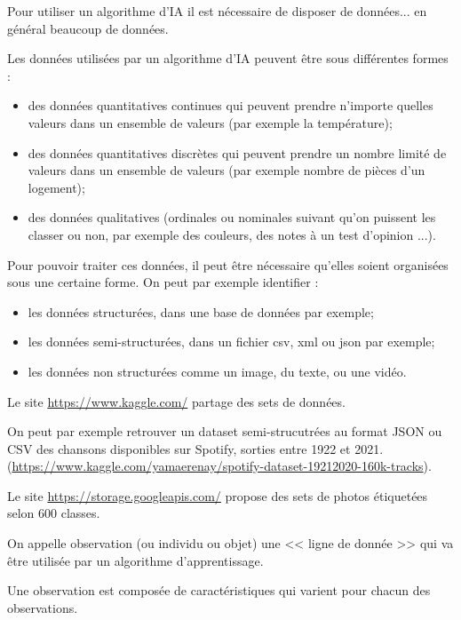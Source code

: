 Pour utiliser un algorithme d'IA il est nécessaire de disposer de données... en général beaucoup de données. 
\begin{defi}[Données]
Les données utilisées par un algorithme d'IA peuvent être sous différentes formes : 
\begin{itemize}
\item des données quantitatives continues qui peuvent prendre n'importe quelles valeurs dans un ensemble de valeurs (par exemple la température);
\item des données quantitatives discrètes qui peuvent prendre un nombre limité de valeurs dans un ensemble de valeurs (par exemple nombre de pièces d'un logement);
\item des données qualitatives (ordinales ou nominales suivant qu'on puissent les classer ou non, par exemple des couleurs, des notes à un test d'opinion ...).
\end{itemize}

\end{defi}

Pour pouvoir traiter ces données, il peut être nécessaire qu'elles soient organisées sous une certaine forme. On peut par exemple identifier : 
\begin{itemize}
\item les données structurées, dans une base de données par exemple;
\item les données semi-structurées, dans un fichier csv, xml ou json par exemple;
\item les données non structurées comme un image, du texte, ou une vidéo.
\end{itemize}

\begin{exemple}
Le site \url{https://www.kaggle.com/} partage des sets de données. 

On peut par exemple retrouver un dataset semi-strucutrées au format JSON ou CSV des chansons disponibles sur Spotify, sorties entre 1922 et 2021. 
(\url{https://www.kaggle.com/yamaerenay/spotify-dataset-19212020-160k-tracks}).

Le site \url{https://storage.googleapis.com/} propose des sets de photos étiquetées selon 600 classes. 
\end{exemple}

\begin{defi}

On appelle observation (ou individu ou objet) une << ligne de donnée >> qui va être utilisée par un algorithme d'apprentissage. 

Une observation est composée de caractéristiques qui varient pour chacun des observations. 
\end{defi}

